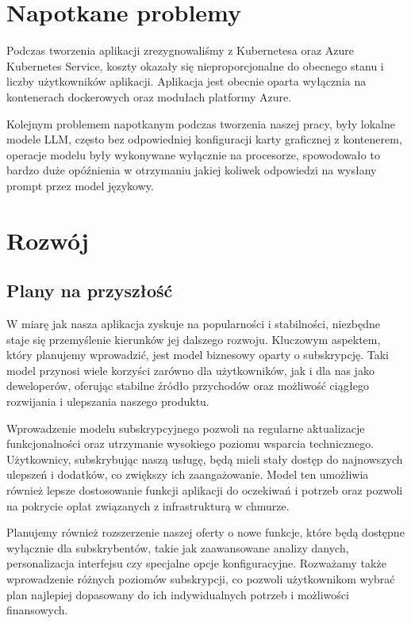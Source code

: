 \section{Napotkane problemy}
Podczas tworzenia aplikacji zrezygnowaliśmy z Kubernetesa oraz Azure Kubernetes Service, koszty okazały się nieproporcjonalne do obecnego stanu i liczby użytkowników aplikacji. Aplikacja jest obecnie oparta wyłącznia na kontenerach dockerowych oraz modułach platformy Azure.

Kolejnym problemem napotkanym podczas tworzenia naszej pracy, były lokalne modele LLM, często bez odpowiedniej konfiguracji karty graficznej z kontenerem, operacje modelu były wykonywane wyłącznie na procesorze, spowodowało to bardzo duże opóźnienia w otrzymaniu jakiej koliwek odpowiedzi na wysłany prompt przez model językowy.


\section{Rozwój}

\subsection{Plany na przyszłość}
W miarę jak nasza aplikacja zyskuje na popularności i stabilności, niezbędne staje się przemyślenie kierunków jej dalszego rozwoju. Kluczowym aspektem, który planujemy wprowadzić, jest model biznesowy oparty o subskrypcję. Taki model przynosi wiele korzyści zarówno dla użytkowników, jak i dla nas jako deweloperów, oferując stabilne źródło przychodów oraz możliwość ciągłego rozwijania i ulepszania naszego produktu.

Wprowadzenie modelu subskrypcyjnego pozwoli na regularne aktualizacje funkcjonalności oraz utrzymanie wysokiego poziomu wsparcia technicznego. Użytkownicy, subskrybując naszą usługę, będą mieli stały dostęp do najnowszych ulepszeń i dodatków, co zwiększy ich zaangażowanie. Model ten umożliwia również lepsze dostosowanie funkcji aplikacji do oczekiwań i potrzeb oraz pozwoli na pokrycie opłat związanych z infrastrukturą w chmurze.

Planujemy również rozszerzenie naszej oferty o nowe funkcje, które będą dostępne wyłącznie dla subskrybentów, takie jak zaawansowane analizy danych, personalizacja interfejsu czy specjalne opcje konfiguracyjne. Rozważamy także wprowadzenie różnych poziomów subskrypcji, co pozwoli użytkownikom wybrać plan najlepiej dopasowany do ich indywidualnych potrzeb i możliwości finansowych.